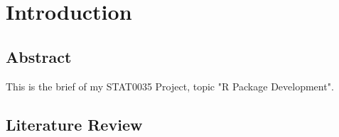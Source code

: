 \chapter{Introduction}

\section{Abstract}
This is the brief of my STAT0035 Project, topic "R Package Development".

\section{Literature Review}

\newpage